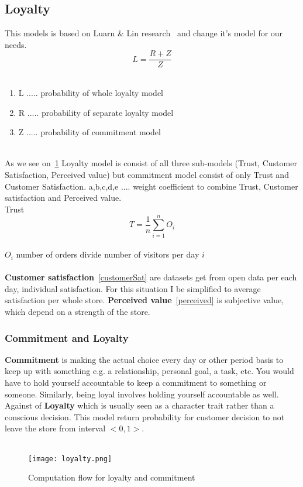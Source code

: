 \subsection{Loyalty} \label{subsec:model_loyalty}
This models is based on Luarn & Lin research~\cite{luarn} and change it's model for our needs.\\
\begin{equation} \label{eq:30}
L = \frac{R+Z}{Z}
\end{equation}
\\
\begin{enumerate}
    \item L ..... probability of whole loyalty model
    \item R ..... probability of separate loyalty model
    \item Z ..... probability of commitment model
\end{enumerate}
\\
As we see on~\ref{Loyalty scheme} Loyalty model is consist of all three sub-models (Trust, Customer Satisfaction, Perceived value)
but commitment model consist of only Trust and Customer Satisfaction.
a,b,c,d,e .... weight coefficient to combine Trust, Customer satisfaction and Perceived value.\\
\newpage
Trust
\begin{equation} \label{eq:31}
T = \frac{1}{n} \sum_{i=1}^{n} O_i
\end{equation}
\\
$O_i$ number of orders divide number of visitors per day $i$
\\
\\
\textbf{Customer satisfaction}~\ref{customerSat} are datasets get from open data per each day, individual satisfaction.
For this situation I be simplified to average satisfaction per whole store.
\textbf{Perceived value}~\ref{perceived} is subjective value, which depend on a strength of the store.
\subsubsection{Commitment and Loyalty} \label{subsubsec:model_loyalty_commitment}
\textbf{Commitment} is making the actual choice every day or other period basis to keep up with something e.g. a relationship, personal goal, a task, etc.
You would have to hold yourself accountable to keep a commitment to something or someone.
Similarly, being loyal involves holding yourself accountable as well.
Against of \textbf{Loyalty} which is usually seen as a character trait rather than a conscious decision.
This model return probability for customer decision to not leave the store from interval $<0,1>$.\\
\\
\begin{figure}[h!]
    \begin{center}
        \texttt{[image: loyalty.png]}
    \end{center}
    \caption{Computation flow for loyalty and commitment}
    \label{Loyalty scheme}
\end{figure}

